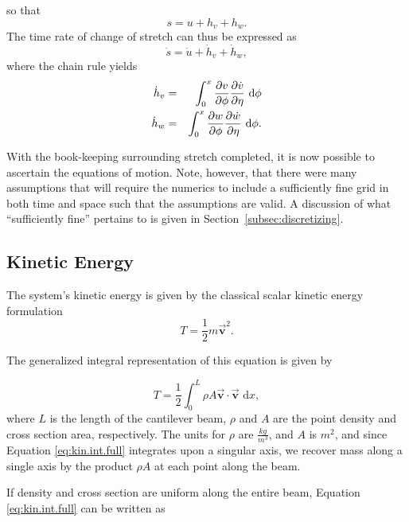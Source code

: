 so that 
\begin{equation}
s = u+h_v+h_w.
\label{eq:stretch.full}
\end{equation}
The time rate of change of stretch can thus be expressed as 
\begin{equation}
\dot s = \dot u + \dot h_v+\dot h_w,
\label{eq:stretch.full.dt}
\end{equation}
where the chain rule yields
\begin{eqnarray}
\dot h_v &=& \int_0^x\frac{\partial v}{\partial\phi}\frac{\partial \dot v}{\partial\eta}\text{ d}\phi{\vrule width 0in depth .1in}\\
\dot h_w &=& \int_0^x\frac{\partial w}{\partial\phi}\frac{\partial \dot w}{\partial\eta}\text{ d}\phi.
\end{eqnarray}

With the book-keeping surrounding stretch completed, it is now possible to ascertain the equations of motion. Note, however, that there were many assumptions that will require the numerics to include a sufficiently fine grid in both time and space such that the assumptions are valid. A discussion of what ``sufficiently fine'' pertains to is given in Section~\ref{subsec:discretizing}.

\subsection{Kinetic Energy}
The system's kinetic energy is given by the classical scalar kinetic energy formulation
\begin{equation}
T = \frac{1}{2}m\vec{\textbf{v}}^2.
\label{eq:kin.scalar}
\end{equation}

The generalized integral representation of this equation is given by

\begin{equation}
T = \frac{1}{2}\int_{0}^{L}\rho A \vec{\textbf{v}}\cdot\vec{\textbf{v}}\text{ d}x,
\label{eq:kin.int.full}
\end{equation}
where $L$ is the length of the cantilever beam, $\rho$ and $A$ are the point density and cross section area, respectively. The units for $\rho$ are $\frac{kg}{m^3}$, and $A$ is $m^2$, and since Equation \ref{eq:kin.int.full} integrates upon a singular axis, we recover mass along a single axis by the product $\rho A$ at each point along the beam.

If density and cross section are uniform along the entire beam, Equation \ref{eq:kin.int.full} can be written as


